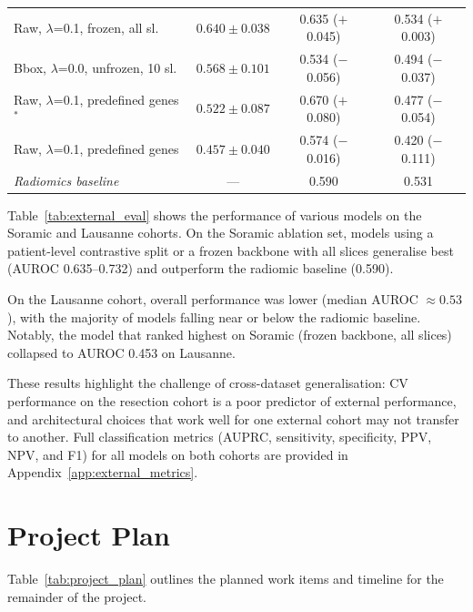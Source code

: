 \documentclass[12pt,twoside]{report}
\begin{document}
\begin{table}[H]
\begin{tabular}{p{5.8cm}ccc}
Raw, $\lambda$=0.1, frozen, all sl.                   & $0.640 \pm 0.038$ & 0.635 ($+$0.045) & 0.534 ($+$0.003) \\
Bbox, $\lambda$=0.0, unfrozen, 10 sl.                 & $0.568 \pm 0.101$ & 0.534 ($-$0.056) & 0.494 ($-$0.037) \\
Raw, $\lambda$=0.1, predefined genes$^{*}$            & $0.522 \pm 0.087$ & 0.670 ($+$0.080) & 0.477 ($-$0.054) \\
Raw, $\lambda$=0.1, predefined genes                  & $0.457 \pm 0.040$ & 0.574 ($-$0.016) & 0.420 ($-$0.111) \\
\hline
\textit{Radiomics baseline} & — & 0.590 & 0.531 \\
\hline
\end{tabular}
\end{table}

Table~\ref{tab:external_eval} shows the performance of various models on the Soramic and Lausanne cohorts.
On the Soramic ablation set, models using a patient-level contrastive split or a frozen backbone
with all slices generalise best (AUROC 0.635--0.732) and outperform the radiomic baseline (0.590).

On the Lausanne cohort, overall performance was lower (median AUROC $\approx 0.53$), with the
majority of models falling near or below the radiomic baseline.
Notably, the model that ranked highest on Soramic (frozen backbone, all slices) collapsed to
AUROC 0.453 on Lausanne.

These results highlight the challenge of cross-dataset generalisation: CV performance on the
resection cohort is a poor predictor of external performance, and architectural choices that
work well for one external cohort may not transfer to another.
Full classification metrics (AUPRC, sensitivity, specificity, PPV, NPV, and F1) for all
models on both cohorts are provided in Appendix~\ref{app:external_metrics}.

\chapter{Project Plan}

Table~\ref{tab:project_plan} outlines the planned work items and timeline for the remainder of the project.
\end{document}

